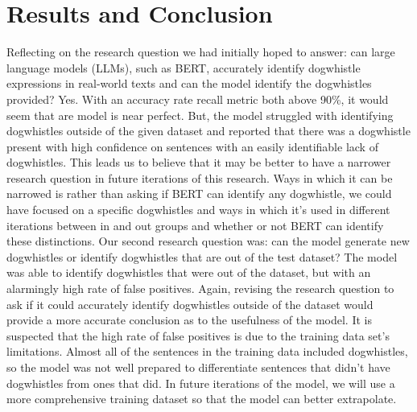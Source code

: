 \documentclass[11pt,a4paper]{article}
\begin{document}
\section{Results and Conclusion}
 Reflecting on the research question we had initially hoped to answer: can large language models (LLMs), such as BERT, accurately identify dogwhistle expressions in real-world texts and can the model identify the dogwhistles provided? Yes. With an accuracy rate recall metric both above 90\%, it would seem that are model is near perfect. But, the model struggled with identifying dogwhistles outside of the given dataset and reported that there was a dogwhistle present with high confidence on sentences with an easily identifiable lack of dogwhistles. This leads us to believe that it may be better to have a narrower research question in future iterations of this research. Ways in which it can be narrowed is rather than asking if BERT can identify any dogwhistle, we could have focused on a specific dogwhistles and ways in which it’s used in different iterations between in and out groups and whether or not BERT can identify these distinctions. Our second research question was: can the model generate new dogwhistles or identify dogwhistles that are out of the test dataset? The model was able to identify dogwhistles that were out of the dataset, but with an alarmingly high rate of false positives. Again, revising the research question to ask if it could accurately identify dogwhistles outside of the dataset would provide a more accurate conclusion as to the usefulness of the model. It is suspected that the high rate of false positives is due to the training data set's limitations. Almost all of the sentences in the training data included dogwhistles, so the model was not well prepared to differentiate sentences that didn’t have dogwhistles from ones that did. In future iterations of the model, we will use a more comprehensive training dataset so that the model can better extrapolate. 
\end{document}
